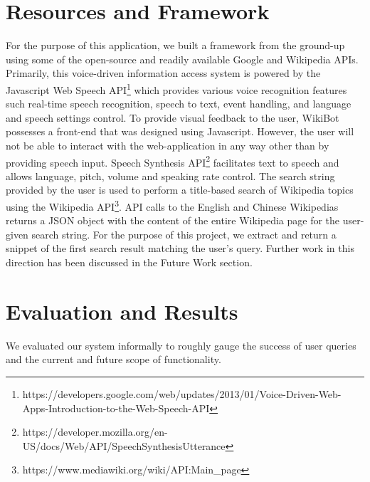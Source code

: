\documentclass[11pt,a4paper]{article}
\begin{document}
\section{Resources and Framework}
For the purpose of this application, we built a framework from the ground-up using some of the open-source and readily available Google and Wikipedia APIs. Primarily, this voice-driven information access system is powered by the Javascript Web Speech API\footnote{https://developers.google.com/web/updates/2013/01/Voice-Driven-Web-Apps-Introduction-to-the-Web-Speech-API} which provides various voice recognition features such real-time speech recognition, speech to text, event handling, and language and speech settings control. 
To provide visual feedback to the user, WikiBot possesses a front-end that was designed using Javascript. However, the user will not be able to interact with the web-application in any way other than by providing speech input. Speech Synthesis API\footnote{https://developer.mozilla.org/en-US/docs/Web/API/SpeechSynthesisUtterance} facilitates text to speech and allows language, pitch, volume and speaking rate control. The search string provided by the user is used to perform a title-based search of Wikipedia topics using the Wikipedia API\footnote{https://www.mediawiki.org/wiki/API:Main\_page}. API calls to the English and Chinese Wikipedias returns a JSON object with the content of the entire Wikipedia page for the user-given search string. For the purpose of this project, we extract and return a snippet of the first search result matching the user's query. Further work in this direction has been discussed in the Future Work section. 

\section{Evaluation and Results}
We evaluated our system informally to roughly gauge the success of user queries and the current and future scope of functionality. 
\end{document}
